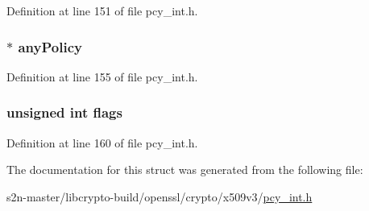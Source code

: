 Definition at line 151 of file pcy\+\_\+int.\+h.

\subsubsection[{\texorpdfstring{any\+Policy}{anyPolicy}}]{$\ast$ any\+Policy}\hypertarget{struct_x509___p_o_l_i_c_y___l_e_v_e_l__st_abef2a24d89a8c82c45f24b97f5fd9979}{}\label{struct_x509___p_o_l_i_c_y___l_e_v_e_l__st_abef2a24d89a8c82c45f24b97f5fd9979}


Definition at line 155 of file pcy\+\_\+int.\+h.

\subsubsection[{\texorpdfstring{flags}{flags}}]{\setlength{\rightskip}{0pt plus 5cm}unsigned int flags}\hypertarget{struct_x509___p_o_l_i_c_y___l_e_v_e_l__st_ac92588540e8c1d014a08cd8a45462b19}{}\label{struct_x509___p_o_l_i_c_y___l_e_v_e_l__st_ac92588540e8c1d014a08cd8a45462b19}


Definition at line 160 of file pcy\+\_\+int.\+h.



The documentation for this struct was generated from the following file\+:\begin{DoxyCompactItemize}
\item 
s2n-\/master/libcrypto-\/build/openssl/crypto/x509v3/\hyperlink{pcy__int_8h}{pcy\+\_\+int.\+h}\end{DoxyCompactItemize}
